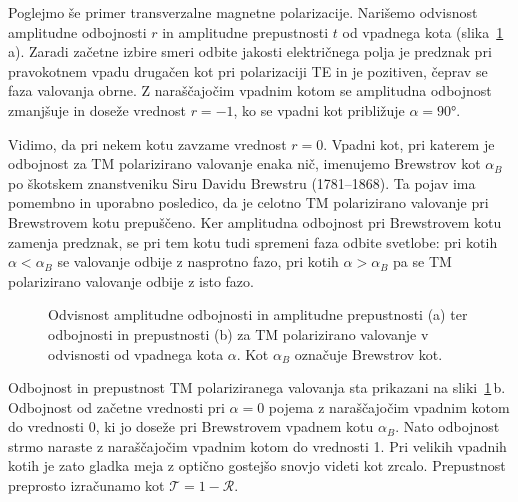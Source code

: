 Poglejmo še primer transverzalne magnetne polarizacije. Narišemo odvisnost
amplitudne odbojnosti $r$ in amplitudne prepustnosti $t$ od vpadnega kota 
(slika~\ref{fig:04_redtm}\,a). Zaradi začetne izbire smeri odbite jakosti
električnega polja je predznak pri pravokotnem vpadu drugačen kot pri 
polarizaciji TE in je pozitiven, čeprav se faza valovanja obrne. 
Z naraščajočim vpadnim kotom se amplitudna
odbojnost zmanjšuje in doseže vrednost $r=-1$, ko se vpadni kot
približuje $\alpha = 90\si{\degree}$.

Vidimo, da pri nekem kotu zavzame  
vrednost $r = 0$. Vpadni kot, pri katerem je odbojnost za TM polarizirano
valovanje enaka nič, imenujemo Brewstrov kot $\alpha_B$ po škotskem 
znanstveniku Siru Davidu Brewstru (1781--1868). Ta pojav ima pomembno in uporabno
posledico, da je celotno TM polarizirano valovanje pri Brewstrovem kotu prepuščeno. 
Ker amplitudna odbojnost pri Brewstrovem kotu zamenja predznak, se pri tem
kotu tudi spremeni faza odbite svetlobe: pri kotih $\alpha < \alpha_B$ se valovanje
odbije z nasprotno fazo, pri kotih $\alpha > \alpha_B$ pa se TM polarizirano
valovanje odbije z isto fazo.
\begin{figure}[ht]
\centering
\def\svgwidth{140truemm} 

\caption{Odvisnost amplitudne odbojnosti in amplitudne prepustnosti (a) ter odbojnosti in 
prepustnosti (b) za TM polarizirano valovanje v odvisnosti od vpadnega kota $\alpha$. Kot
$\alpha_B$ označuje Brewstrov kot.}
\label{fig:04_redtm}
\end{figure}

Odbojnost in prepustnost TM polariziranega valovanja sta prikazani na
sliki~\ref{fig:04_redtm}\,b. Odbojnost od začetne vrednosti pri $\alpha=0$
pojema z naraščajočim vpadnim kotom do vrednosti 0, ki jo doseže pri 
Brewstrovem vpadnem kotu $\alpha_B$. Nato odbojnost strmo naraste z naraščajočim vpadnim
kotom do vrednosti 1. Pri velikih vpadnih kotih je zato
gladka meja z optično gostejšo snovjo videti kot zrcalo. Prepustnost preprosto izračunamo 
kot $\mathcal{T} = 1- \mathcal{R}$.

